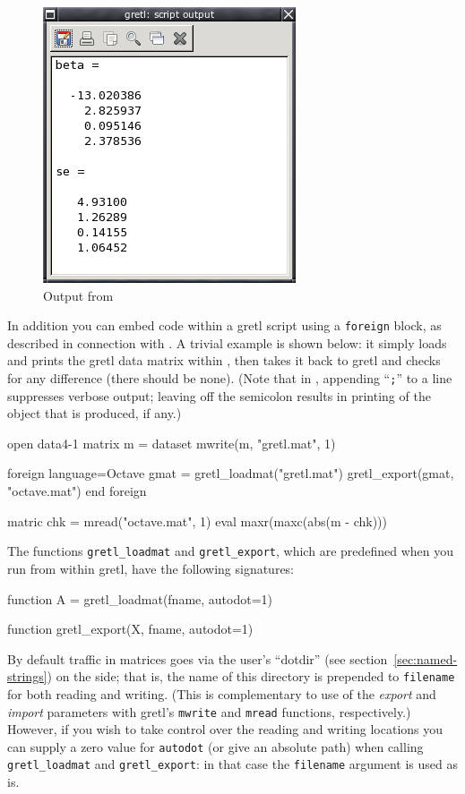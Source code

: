 \begin{figure}[htbp]
  \centering
  \includegraphics[scale=0.7]{figures/Octout}
  \caption{Output from }
  \label{fig:Octout}
\end{figure}

In addition you can embed  code within a gretl script
using a \texttt{foreign} block, as described in connection with
.  A trivial example is shown below: it simply loads and prints
the gretl data matrix within , then takes it back to gretl
and checks for any difference (there should be none). (Note that in
, appending ``\texttt{;}'' to a line suppresses verbose
output; leaving off the semicolon results in printing of the object
that is produced, if any.)
%
\begin{code}
open data4-1
matrix m = { dataset }
mwrite(m, "gretl.mat", 1)

foreign language=Octave
   gmat = gretl_loadmat("gretl.mat")
   gretl_export(gmat, "octave.mat")
end foreign

matric chk = mread("octave.mat", 1)
eval maxr(maxc(abs(m - chk)))
\end{code}

The functions \texttt{gretl\_loadmat} and \texttt{gretl\_export},
which are predefined when you run  from within gretl, have
the following signatures:
\begin{code}
function A = gretl_loadmat(fname, autodot=1)

function gretl_export(X, fname, autodot=1)
\end{code}

By default traffic in matrices goes via the user's ``dotdir'' (see
section~\ref{sec:named-strings}) on the  side; that is,
the name of this directory is prepended to \texttt{filename} for both
reading and writing. (This is complementary to use of the
\textsl{export} and \textsl{import} parameters with gretl's
\texttt{mwrite} and \texttt{mread} functions, respectively.)  However,
if you wish to take control over the reading and writing locations you
can supply a zero value for \texttt{autodot} (or give an absolute
path) when calling \verb|gretl_loadmat| and \verb|gretl_export|: in
that case the \texttt{filename} argument is used as is.


